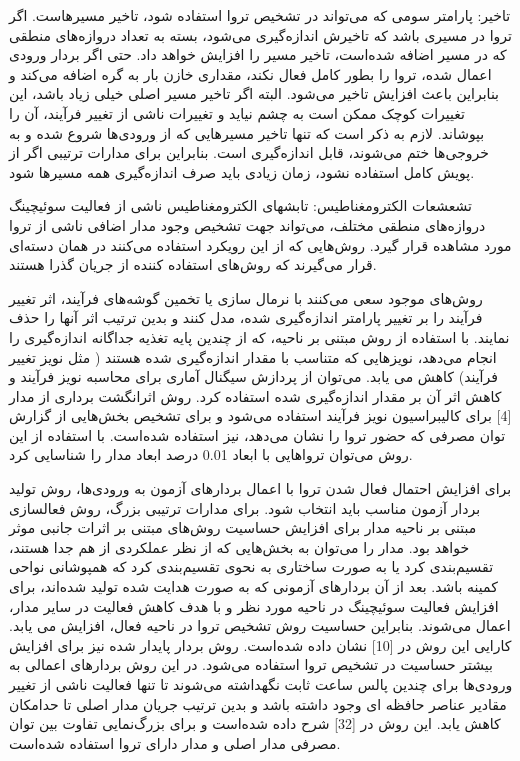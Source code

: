 تاخیر: پارامتر سومی که می‌تواند در تشخیص تروا استفاده شود، تاخیر مسیرهاست. اگر تروا در مسیری باشد که تاخیرش اندازه‌گیری می‌شود، بسته به تعداد دروازه‌های منطقی که در مسیر اضافه شده‌است، تاخیر مسیر را افزایش خواهد داد. حتی اگر بردار ورودی اعمال شده، تروا را  بطور کامل فعال نکند، مقداری خازن بار به گره اضافه می‌کند و بنابراین باعث افزایش تاخیر می‌شود. البته اگر تاخیر مسیر اصلی خیلی زیاد باشد، این تغییرات کوچک ممکن است به چشم نیاید و تغییرات ناشی از تغییر فرآیند، آن را بپوشاند. لازم به ذکر است که تنها تاخیر مسیرهایی که از ورودی‌ها شروع شده و به خروجی‌ها ختم می‌شوند، قابل اندازه‌گیری است. بنابراین برای مدارات ترتیبی اگر از پویش کامل استفاده نشود، زمان زیادی باید صرف اندازه‌گیری همه مسیرها شود.

تشعشعات الکترومغناطیس: تابشهای الکترومغناطیس ناشی از فعالیت سوئیچینگ دروازه‌های منطقی مختلف، می‌تواند جهت تشخیص وجود مدار اضافی ناشی از تروا مورد مشاهده قرار گیرد. روش‌هایی که از این رویکرد استفاده می‌کنند در همان دسته‌ای قرار می‌گیرند که روش‌های استفاده کننده از جریان گذرا هستند.

روش‌های موجود سعی می‌کنند با نرمال سازی یا تخمین گوشه‌های فرآیند، اثر تغییر فرآیند را بر تغییر پارامتر اندازه‌گیری شده، مدل کنند و بدین ترتیب اثر آنها را حذف نمایند. با استفاده از روش مبتنی بر ناحیه، که از چندین پایه تغذیه جداگانه اندازه‌گیری را انجام می‌دهد، نویزهایی که متناسب با مقدار اندازه‌گیری شده هستند ( مثل نویز تغییر فرآیند) کاهش می یابد. می‌توان از پردازش سیگنال آماری برای محاسبه نویز فرآیند و کاهش اثر آن بر مقدار اندازه‌گیری شده ‌استفاده کرد.
روش اثرانگشت برداری از مدار [4] برای کالیبراسیون نویز فرآیند استفاده می‌شود و برای تشخیص بخش‌هایی از گزارش توان مصرفی که حضور تروا را نشان می‌دهد، نیز استفاده شده‌است. با استفاده از این روش می‌توان تروا‌هایی با ابعاد 0.01 درصد ابعاد مدار را شناسایی کرد. 

برای افزایش احتمال فعال شدن تروا با اعمال بردارهای آزمون به ورودی‌ها، روش تولید بردار آزمون مناسب باید انتخاب شود. برای مدارات ترتیبی بزرگ، روش فعالسازی مبتنی بر ناحیه مدار برای افزایش حساسیت روش‌های مبتنی بر اثرات جانبی موثر خواهد بود. مدار را می‌توان به بخش‌هایی که از نظر عملکردی از هم جدا هستند، تقسیم‌بندی کرد یا به صورت ساختاری به نحوی تقسیم‌بندی کرد که همپوشانی نواحی کمینه باشد. بعد از آن بردارهای آزمونی که به صورت هدایت شده تولید شده‌اند، برای افزایش فعالیت سوئیچینگ در ناحیه مورد نظر و با هدف کاهش فعالیت در سایر مدار، اعمال می‌شوند. بنابراین حساسیت روش تشخیص تروا در ناحیه فعال، افزایش می یابد. کارایی این روش در [10] نشان داده شده‌است. روش بردار پایدار شده نیز برای افزایش بیشتر حساسیت در تشخیص تروا استفاده می‌شود. در این روش بردارهای اعمالی به ورودی‌ها برای چندین پالس ساعت ثابت نگهداشته می‌شوند تا تنها فعالیت ناشی از تغییر مقادیر عناصر حافظه ای وجود داشته باشد و بدین ترتیب جریان مدار اصلی تا حدامکان کاهش یابد. این روش در [32] شرح داده شده‌است و برای بزرگ‌نمایی تفاوت بین توان مصرفی مدار اصلی و مدار دارای تروا استفاده شده‌است.

